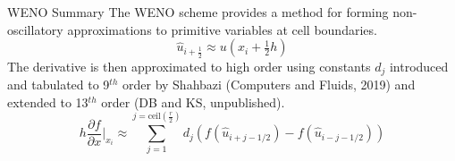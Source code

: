 \documentclass[10pt]{beamer}
\begin{document}

\begin{frame}{WENO Summary}
  The WENO scheme provides a method for forming non-oscillatory approximations to primitive variables at cell boundaries.
  $$
  \hat{u}_{i+\frac{1}{2}} \approx u(x_{i}+\tfrac{1}{2}h)
  $$
  The derivative is then approximated to high order using constants $d_j$ introduced and tabulated to 9$^{th}$ order by Shahbazi (Computers and Fluids, 2019) and extended to 13$^{th}$ order (DB and KS, unpublished).
  $$	h\frac{\partial f}{\partial x}\bigg|_{x_i}\approx \sum_{j=1}^{j=\text{ceil}(\tfrac{r}{2})}d_j(f(\hat{u}_{i+j-1/2})-f(\hat{u}_{i-j-1/2}))$$
\end{frame}
\end{document}
